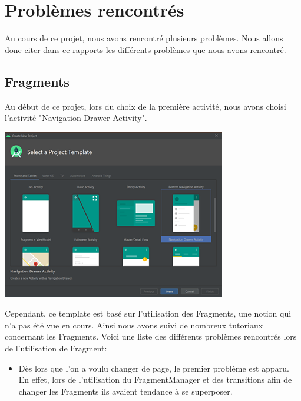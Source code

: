 \documentclass[12pt,a4paper]{report}
\begin{document}
\section{Problèmes rencontrés}
\begin{flushleft}
\justify
Au cours de ce projet, nous avons rencontré plusieurs problèmes. Nous allons donc citer dans ce rapports les différents problèmes que nous avons rencontré.
\end{flushleft}
\subsection{Fragments}
\begin{flushleft}
\justify
Au début de ce projet, lors du choix de la première activité, nous avons choisi l'activité "Navigation Drawer Activity".\cite{1}\\
\center
\begin{minipage}{0.48\linewidth}
\includegraphics[width=\linewidth]{Template}
\end{minipage}
\justify
Cependant, ce template est basé sur l'utilisation des 
Fragments, une notion qui n'a pas été vue en cours. Ainsi nous avons suivi de nombreux tutoriaux concernant les Fragments. Voici une liste des différents problèmes rencontrés lors de l'utilisation de Fragment: 
\begin{itemize}
\item Dès lors que l'on a voulu changer de page, le premier problème est apparu. En effet, lors de l'utilisation du FragmentManager et des transitions afin de changer les Fragments ils avaient tendance à se superposer. 

\end{itemize}
\end{flushleft}
\end{document}
